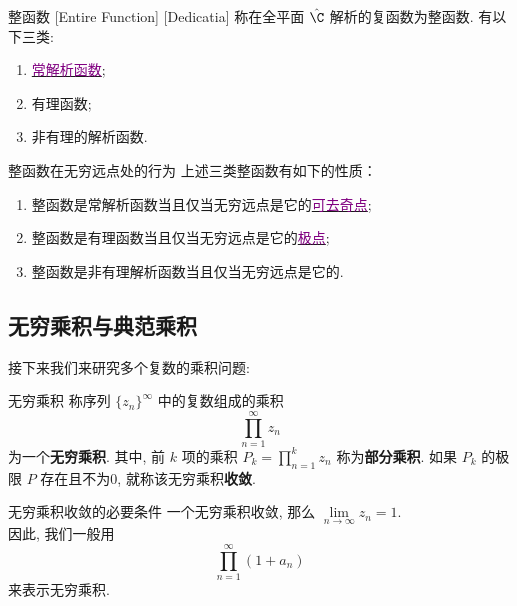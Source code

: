 \documentclass[UTF8]{ctexart}
\newcommand{\hyperrefc}[2]{\hyperref[#1]{\textcolor{purple}{#2}}}
\begin{document}
        \begin{dfn}
            [EntireFunction]
            {整函数}
            [Entire Function]
            [Dedicatia]
            称在全平面 \(\hat{\C}\) 解析的复函数为整函数. 有以下三类: 
            \begin{enumerate}
                \item \hyperrefc{ppt:TrivialAnalyticalFunction}{常解析函数}; 
                \item 有理函数; 
                \item 非有理的解析函数. 
            \end{enumerate}
        \end{dfn}

        \begin{ppt}
            {整函数在无穷远点处的行为}
            上述三类整函数有如下的性质：
            \begin{enumerate}
                \item 整函数是常解析函数当且仅当无穷远点是它的\hyperrefc{dfn:RemovableSingularity}{可去奇点};
                \item 整函数是有理函数当且仅当无穷远点是它的\hyperrefc{dfn:PolarSingularity}{极点};
                \item 整函数是非有理解析函数当且仅当无穷远点是它的\EssentialSingularity.
            \end{enumerate}
        \end{ppt}
    
    \subsection{无穷乘积与典范乘积}

        接下来我们来研究多个复数的乘积问题: 

        \begin{dfn}
            {无穷乘积}
            称序列 \(\{z_n\}^\infty\) 中的复数组成的乘积
            \[\prod_{n=1}^{\infty}z_n\]
            为一个\textbf{无穷乘积}. 其中, 前 \(k\) 项的乘积 \(P_k=\prod\limits_{n=1}^{k}z_n\) 称为\textbf{部分乘积}. 如果 \(P_k\) 的极限 \(P\) 存在且不为0, 就称该无穷乘积\textbf{收敛}. 
        \end{dfn}

        \begin{ppt}
            {无穷乘积收敛的必要条件}
            一个无穷乘积收敛, 那么 \(\lim\limits_{n\to\infty}z_n=1\).\\
            因此, 我们一般用
            \[\prod_{n=1}^{\infty}(1+a_n)\]
            来表示无穷乘积. 
        \end{ppt}
\end{document}
